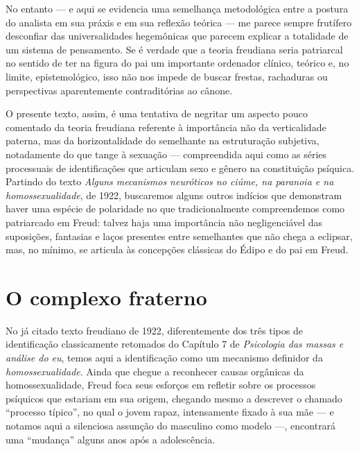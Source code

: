 No entanto --- e aqui se evidencia uma semelhança metodológica entre a
postura do analista em sua práxis e em sua reflexão teórica --- me
parece sempre frutífero desconfiar das universalidades hegemônicas que
parecem explicar a totalidade de um sistema de pensamento. Se é verdade
que a teoria freudiana seria patriarcal no sentido de ter na figura do
pai um importante ordenador clínico, teórico e, no limite,
epistemológico, isso não nos impede de buscar frestas, rachaduras ou
perspectivas aparentemente contraditórias ao cânone.

O presente texto, assim, é uma tentativa de negritar um aspecto pouco
comentado da teoria freudiana referente à importância não da
verticalidade paterna, mas da horizontalidade do semelhante na
estruturação subjetiva, notadamente do que tange à sexuação ---
compreendida aqui como as séries processuais de identificações que
articulam sexo e gênero na constituição psíquica. Partindo do texto
\emph{Alguns mecanismos neuróticos no ciúme, na paranoia e na
homossexualidade}, de 1922, buscaremos alguns outros indícios que
demonstram haver uma espécie de polaridade no que tradicionalmente
compreendemos como patriarcado em Freud: talvez haja uma importância não
negligenciável das suposições, fantasias e laços presentes entre
semelhantes que não chega a eclipsar, mas, no mínimo, se articula às
concepções clássicas do Édipo e do pai em Freud.

\section{O complexo fraterno}

No já citado texto freudiano de 1922, diferentemente dos três tipos de
identificação classicamente retomados do Capítulo 7 de \emph{Psicologia das
massas e análise do eu}, temos aqui a identificação como um mecanismo
definidor da \emph{homossexualidade}. Ainda que chegue a reconhecer
causas orgânicas da homossexualidade, Freud foca seus esforços em
refletir sobre os processos psíquicos que estariam em sua origem,
chegando mesmo a descrever o chamado ``processo típico'', no qual o
jovem rapaz, intensamente fixado à sua mãe --- e notamos aqui a
silenciosa assunção do masculino como modelo ---, encontrará uma
``mudança'' alguns anos após a adolescência.

